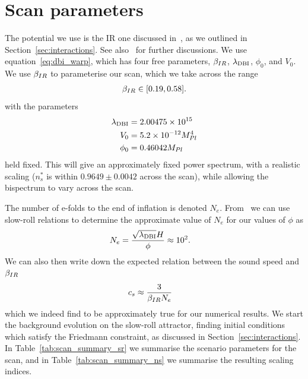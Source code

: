 \section{Scan parameters}\label{sec:setup}
The potential we use is the IR one discussed in~\cite{Bean_ir_dbi}, as
we outlined in Section~\ref{sec:interactions}.
See also~\cite{Chen_dbi, warp_features_dbi} for further discussions.
    We use equation~\eqref{eq:dbi_warp}, which has four free parameters,
    $\beta_{IR}$, $\lambda_{\text{DBI}}$, $\phi_0$, and $V_0$.
    We use $\beta_{IR}$ to parameterise our scan,
    which we take across the range
    \begin{align}\label{eq:bir_range}
        \beta_{IR}\in[0.19, 0.58].
    \end{align}
    with the parameters
    \begin{align}\label{eq:scan_params}
        \lambda_{\text{DBI}}&=2.00475\times10^{15}\\
        V_0 &= 5.2\times10^{-12}M_{Pl}^4\\
        \phi_0 &= 0.46042M_{Pl}
    \end{align}
    held fixed.
    This will give an approximately fixed power spectrum, with a realistic
    scaling ($n_s^{*}$ is within $0.9649\pm0.0042$ across the scan),
    while allowing the bispectrum to vary across the scan.


    The number of e-folds to the end of inflation is denoted $N_e$.
    From~\cite{Chen_dbi} we can use slow-roll relations to determine the approximate
    value of $N_e$
    for our values of $\phi$ as
    \begin{align}
        N_e &= \frac{\sqrt{\lambda_{\dbi}}H}{\phi}\approx10^2.%
    \end{align}
    We can also then write down the expected relation between the sound speed
    and $\beta_{IR}$
    \begin{align}
        c_s &\approx \frac{3}{\bir N_e}%
    \end{align}
    which we indeed find to be approximately true for our numerical results.
    We start the background evolution on the slow-roll attractor, finding initial conditions which
    satisfy the Friedmann constraint, as discussed in Section~\ref{sec:interactions}.
    In Table~\ref{tab:scan_summary_sr} we summarise the scenario parameters for the scan,
    and in Table~\ref{tab:scan_summary_ns} we summarise the resulting scaling indices.
 

